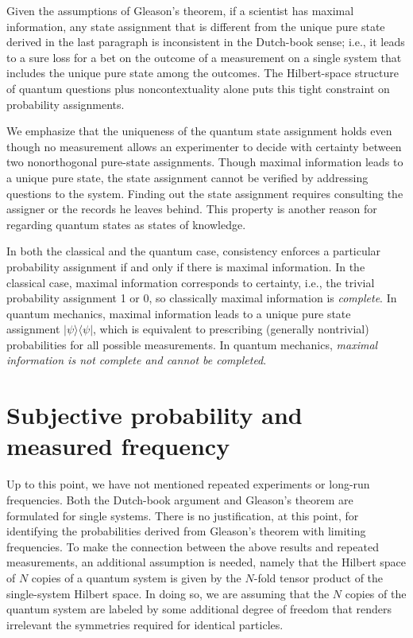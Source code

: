 Given the assumptions of Gleason's theorem, if a scientist has
maximal information, any state assignment that is different from the
unique pure state derived in the last paragraph is inconsistent in
the Dutch-book sense; i.e., it leads to a sure loss for a bet on the
outcome of a measurement on a single system that includes the unique
pure state among the outcomes.  The Hilbert-space structure of
quantum questions plus noncontextuality alone puts this tight
constraint on probability assignments.

We emphasize that the uniqueness of the quantum state assignment
holds even though no measurement allows an experimenter to decide
with certainty between two nonorthogonal pure-state assignments.
Though maximal information leads to a unique pure state, the state
assignment cannot be verified by addressing questions to the system.
Finding out the state assignment requires consulting the assigner or
the records he leaves behind.  This property is another reason for
regarding quantum states as states of knowledge.

In both the classical and the quantum case, consistency enforces a
particular probability assignment if and only if there is maximal
information.  In the classical case, maximal information corresponds
to certainty, i.e., the trivial probability assignment 1 or 0, so
classically maximal information is {\it complete}.  In quantum
mechanics, maximal information leads to a unique pure state
assignment $|\psi\rangle\langle\psi|$, which is equivalent to
prescribing (generally nontrivial) probabilities for all possible
measurements. In quantum mechanics, {\it maximal information is not
complete and cannot be completed}.

\section{Subjective probability and measured frequency}

Up to this point, we have not mentioned repeated experiments or
long-run frequencies. Both the Dutch-book argument and Gleason's
theorem are formulated for single systems.  There is no
justification, at this point, for identifying the probabilities
derived from Gleason's theorem with limiting frequencies.  To make
the connection between the above results and repeated measurements,
an additional assumption is needed, namely that the Hilbert space of
$N$ copies of a quantum system is given by the $N$-fold tensor
product of the single-system Hilbert space.  In doing so, we are
assuming that the $N$ copies of the quantum system are labeled by
some additional degree of freedom that renders irrelevant the
symmetries required for identical particles.

